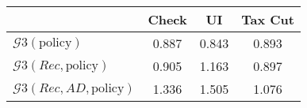 \begin{tabular}{@{}lccc@{}} 
\toprule 
                          & Check      & UI    & Tax Cut    \\  \midrule 
$\mathcal{G}3(\text{policy})$ & 0.887  & 0.843  & 0.893     \\ 
$\mathcal{G}3(Rec,\text{policy})$ & 0.905  & 1.163  & 0.897     \\ 
$\mathcal{G}3(Rec, AD,\text{policy})$ & 1.336  & 1.505  & 1.076     \\ 
\end{tabular}  
